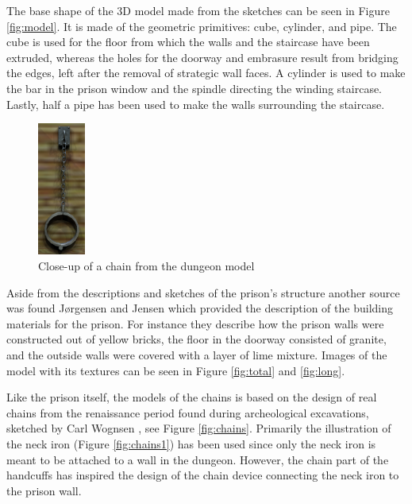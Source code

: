 The base shape of the 3D model made from the sketches can be seen in Figure \ref{fig:model}. It is made of the geometric primitives: cube, cylinder, and pipe. The cube is used for the floor from which the walls and the staircase have been extruded, whereas the holes for the doorway and embrasure result from bridging the edges, left after the removal of strategic wall faces. A cylinder is used to make the bar in the prison window and the spindle directing the winding staircase. Lastly, half a pipe has been used to make the walls surrounding the staircase.%

\begin{figure}
   \centering
   \includegraphics[width=0.14\textwidth]{figures/chainmodel.png}
   \caption{Close-up of a chain from the dungeon model}\label{fig:chain_model}
\end{figure}

Aside from the descriptions and sketches of the prison’s structure another source was found Jørgensen \cite{Jorgensen1934} and Jensen \cite{Jensen1909} which provided the description of the building materials for the prison. For instance they describe how the prison walls were constructed out of yellow bricks, the floor in the doorway consisted of granite, and the outside walls were covered with a layer of lime mixture. Images of the model with its textures can be seen in Figure \ref{fig:total} and \ref{fig:long}.

Like the prison itself, the models of the chains is based on the design of real chains from the renaissance period found during archeological excavations, sketched by Carl Wognsen \cite{Riismoller1961}, see Figure \ref{fig:chains}. Primarily the illustration of the neck iron (Figure \ref{fig:chains1}) has been used since only the neck iron is meant to be attached to a wall in the dungeon. However, the chain part of the handcuffs has inspired the design of the chain device connecting the neck iron to the prison wall.\pagebreak

